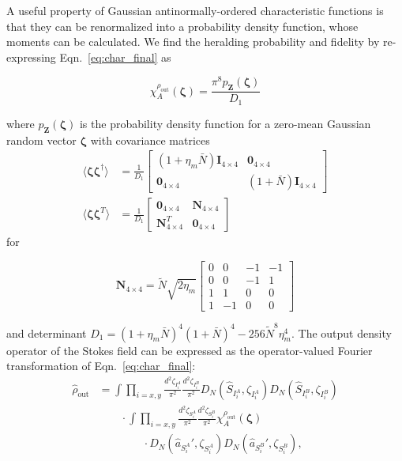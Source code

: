 \documentclass[aps,twocolumn,secnumarabic,amsmath,amssymb,pra,groupedaddress,
showpacs, showkeys,draft]{revtex4-1}
\newcommand{\pna}[1]{\left(#1\right)}
\newcommand{\eqn}[1]{
\begin{equation}
	#1
\end{equation}
}
\begin{document}
A useful property of Gaussian antinormally-ordered characteristic functions is
that they can be renormalized into a probability density function, whose
moments can be calculated. We find the heralding probability and fidelity by
re-expressing Eqn.~\ref{eq:char_final} as
\eqn{
\chi_A^{\rho_{\textrm{out}}}\pna{\bm{\zeta}}=\frac{\pi^8 p_{\mathbf{Z}}\pna{\bm{\zeta}}}{D_1}
}
where $p_{\mathbf{Z}}\pna{\bm{\zeta}}$ is the probability density function for
a zero-mean Gaussian random vector $\bm{\zeta}$ with covariance matrices
\begin{align}
\langle \bm{\zeta}\bm{\zeta}^{\dagger}\rangle&=\frac{1}{D_1}\left[ 
\begin{array}{cc}
\pna{1+\eta_{m} \bar{N}} \mathbf{I}_{4\times 4} &  \mathbf{0}_{4\times 4} \\
 \mathbf{0}_{4\times 4} & \pna{1+\bar{N}} \mathbf{I}_{4\times 4}
\end{array} 
\right] \nonumber \\
\langle \bm{\zeta}\bm{\zeta}^{T}\rangle&=\frac{1}{D_1}\left[ 
\begin{array}{cc}
 \mathbf{0}_{4\times 4} & \mathbf{N}_{4\times 4} \\
 \mathbf{N}_{4\times 4}^T & \mathbf{0}_{4\times 4}
\end{array} 
\right]\label{eq:chap3:moments}
\end{align}
for 
\eqn{
\mathbf{N}_{4\times 4}=\tilde{N}\sqrt{2\eta_{m}}\left[ 
\begin{array}{cccc}
0 & 0 & -1 & -1\\
0 & 0 & -1 & 1\\
1 & 1 & 0 & 0\\
1 & -1 & 0 & 0
\end{array} 
\right]
}
and determinant $D_1=\pna{1+\eta_{m} \bar{N}}^4
\pna{1+\bar{N}}^4-256 \tilde{N}^8 \eta_{m}^4$. The output density
operator of the Stokes field can be expressed as the operator-valued Fourier
transformation of Eqn.~\ref{eq:char_final}:
\begin{align}
\hat{\rho}_{\textrm{out}}& =\int 
\prod_{i=x,y}
\frac{d^2 \zeta_{I_i^A}}{\pi^2} 
\frac{d^2 \zeta_{I_i^B}}{\pi^2} 
D_N\pna{\hat{S}_{I_i^A},\zeta_{I_i^A}} 
D_N\pna{\hat{S}_{I_i^B},\zeta_{I_i^B}}  \nonumber \\
& \qquad \cdot \int 
\prod_{i=x,y}
\frac{d^2 \zeta_{S_i^A}}{\pi^2} 
\frac{d^2 \zeta_{S_i^B}}{\pi^2}
\chi_A^{\rho_{\textrm{out}}}\pna{\bm{\zeta}} \nonumber \\
&\qquad \qquad \cdot D_N\pna{\hat{a}_{S_i^A}',\zeta_{S_i^A}} 
D_N\pna{\hat{a}_{S_i^B}',\zeta_{S_i^B}},
\label{eq:fourier_char}
\end{align}
\end{document}
